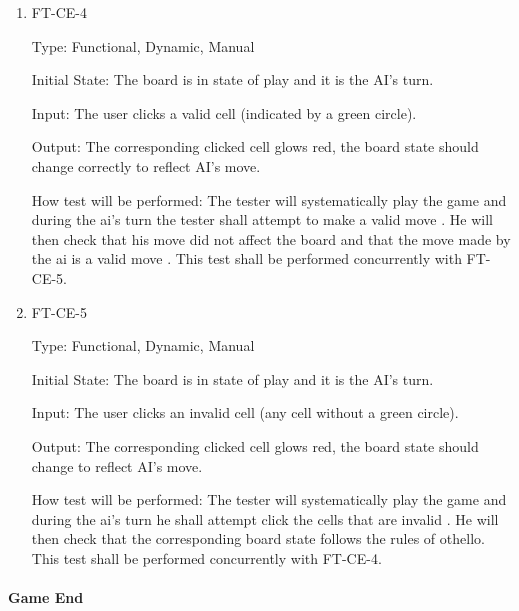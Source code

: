 \documentclass[12pt, titlepage]{article}
\begin{document}
\begin{enumerate}
	\item FT-CE-4

	      Type: Functional, Dynamic, Manual

	      Initial State: The board is in state of play and it is the AI's turn.

	      Input: The user clicks a valid cell (indicated by a green circle).

	      Output: The corresponding clicked cell glows red, the board state should change correctly to reflect AI's move.

	      How test will be performed: The tester will systematically play the game and during the ai's turn the tester shall attempt to make a valid move . He will then check that his move did not affect the board and that the move made by the ai is a valid move . This test shall be performed concurrently with FT-CE-5.


	\item FT-CE-5

	      Type: Functional, Dynamic, Manual

	      Initial State: The board is in state of play and it is the AI's turn.

	      Input: The user clicks an invalid cell (any cell without a green circle).

	      Output: The corresponding clicked cell glows red, the board state should change to reflect AI's move.

	      How test will be performed: The tester will systematically play the game and during the ai's turn he shall attempt click the cells that are invalid . He will then check that the corresponding board state follows the rules of othello. This test shall be performed concurrently with FT-CE-4.



\end{enumerate}
\paragraph{Game End}
\end{document}

